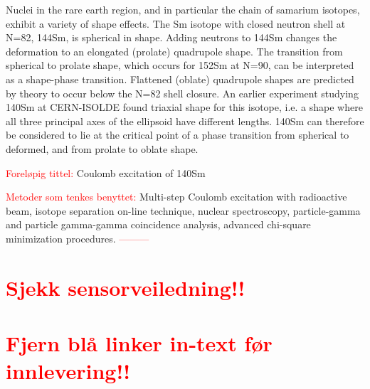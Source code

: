 \documentclass[twoside,english]{uiofysmaster/uiofysmaster}
\begin{document}
Nuclei in the rare earth region, and in particular the chain of samarium isotopes, exhibit a variety of shape effects. The Sm isotope with closed neutron shell at N=82, 144Sm, is spherical in shape. Adding neutrons to 144Sm changes the deformation to an elongated (prolate) quadrupole shape. The transition from spherical to prolate shape, which occurs for 152Sm at N=90, can be interpreted as a shape-phase transition. Flattened (oblate) quadrupole shapes are predicted by theory to occur below the N=82 shell closure. An earlier experiment studying 140Sm at CERN-ISOLDE found triaxial shape for this isotope, i.e. a shape where all three principal axes of the ellipsoid have different lengths. 140Sm can therefore be considered to lie at the critical point of a phase transition from spherical to deformed, and from prolate to oblate shape. \newline

\textcolor{red}{Foreløpig tittel:} \newline
Coulomb excitation of 140Sm \newline


\textcolor{red}{Metoder som tenkes benyttet:} \newline
Multi-step Coulomb excitation with radioactive beam, isotope separation on-line technique, nuclear spectroscopy, particle-gamma and particle gamma-gamma coincidence analysis, advanced chi-square minimization procedures. \newline
\textcolor{red}{---------} \newline


\section*{\textcolor{red}{Sjekk sensorveiledning!!}}


\section*{\textcolor{red}{Fjern blå linker in-text før innlevering!!}}
\end{document}
